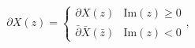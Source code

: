 \begin{equation}
\partial X(z)= \left\{ \begin{array}{ll}
                         \partial X(z) & \mbox{Im}(z) \geq 0 \\
                         \bar{\partial}\bar{X}(\bar{z}) & \mbox{Im}(z) <
                         0
                        \end{array} \right.,
\end{equation}

